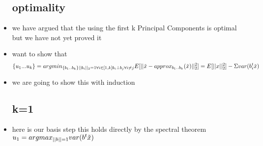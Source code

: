 \documentclass{article}
\begin{document}
\begin{itemize}
\subsection*{optimality}
\item we have argued that the using the first k Principal Components is optimal but we have not yet proved it 
\item want to show that  $$\{u_1...u_k\}=argmin_{\{b_1..b_k  \} \\ ||b_i||_2=1 \forall i\in [1,k] \\ b_i\perp b_j \forall i\neq j  }E[||\Tilde{x}-approx_{b_1..b_k}(\Tilde{x}) ||_{2}^{2}]=E[||x||_{2}^{2}]-\Sigma var(b_i^{t}\Tilde{x})$$
\item we are going to show this with induction 
\subsection*{k=1}
\item here is our basis step this holds directly by the spectral theorem $u_1=argmax_{||b||=1}var(b^t\Tilde{x})$ 


\end{itemize}
\end{document}
